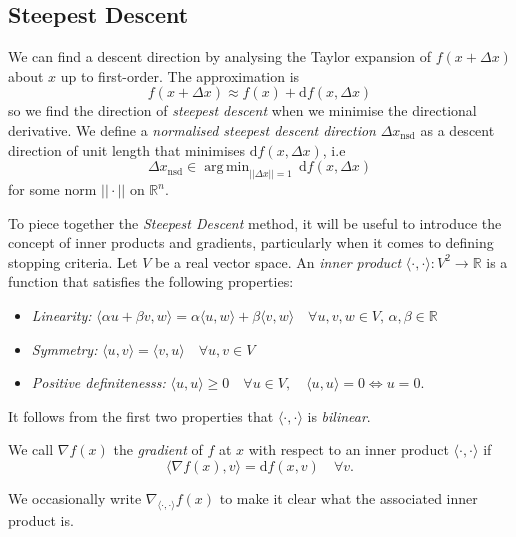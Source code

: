 \documentclass[a4paper,11pt]{article}
\DeclareMathOperator*{\argmin}{arg\,min}
\begin{document}
\subsection{Steepest Descent}

We can find a descent direction by analysing the Taylor expansion of $f(x+\Delta x)$ about $x$ up to first-order. The approximation is $$f(x+\Delta x)\approx f(x) +\text{d}f(x,\Delta x)$$ so we find the direction of \textit{steepest descent} when we minimise the directional derivative. We define a \textit{normalised steepest descent direction} $\Delta x_{\text{nsd}}$ as a descent direction of unit length that minimises $\text{d}f(x,\Delta x)$, i.e $$\Delta x_{\text{nsd}}\in \argmin_{||\Delta x||= 1} \,\text{d}f(x,\Delta x)$$ for some norm $||\cdot||$ on $\mathbb{R}^n$. 

\newpage

To piece together the \textit{Steepest Descent} method, it will be useful to introduce the concept of inner products and gradients, particularly when it comes to defining stopping criteria. Let $V$ be a real vector space. An \textit{inner product} $\langle\cdot,\cdot\rangle:V^2\rightarrow \mathbb{R}$ is a function that satisfies the following properties:
\begin{itemize}
    \item \textit{Linearity:} $\langle \alpha u + \beta v, w\rangle =\alpha \langle u,w\rangle + \beta \langle v, w\rangle \quad \forall u,v,w \in V, \, \alpha,\beta\in\mathbb{R}$
    \item \textit{Symmetry:} $\langle u,v\rangle = \langle v,u \rangle \quad \forall u,v\in V$
    \item \textit{Positive definitenesss:} $\langle u,u\rangle \geqslant 0 \quad \forall u\in V, \quad \langle u,u\rangle =0 \Longleftrightarrow u=0.$
\end{itemize}

It follows from the first two properties that $\langle\cdot,\cdot\rangle$ is \textit{bilinear}.

\vspace{3mm}

We call $\nabla f(x)$ the \textit{gradient} of $f$ at $x$ with respect to an inner product $\langle \cdot ,\cdot\rangle$ if $$\langle \nabla f(x),v\rangle=\text{d}f(x,v) \quad \forall v.$$

We occasionally write $\nabla_{\langle\cdot,\cdot\rangle} f(x)$ to make it clear what the associated inner product is.

\vspace{3mm}
\end{document}

